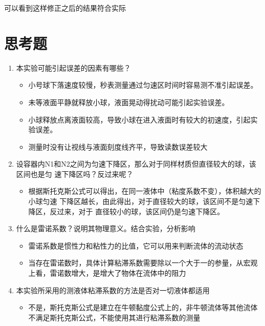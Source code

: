 \documentclass{article}
\begin{document}
可以看到这样修正之后的结果符合实际

\section{思考题}
\begin{enumerate}
    \item 本实验可能引起误差的因素有哪些？
    \begin{itemize}
        \item 小号球下落速度较慢，秒表测量通过匀速区时间时容易测不准引起误差。
        \item 未等液面平静就释放小球，液面晃动得扰动可能引起实验误差。
        \item 小球释放点离液面较高，导致小球在进入液面时有较大的初速度，引起实验误差。
        \item 测量时没有让视线与液面刻度线齐平，导致读数误差较大
    \end{itemize}
    \item 设容器内N1和N2之间为匀速下降区，那么对于同样材质但直径较大的球，该区间也是匀
    速下降区吗？反过来呢？
    \begin{itemize}
        \item 根据斯托克斯公式可以得出，在同一液体中（粘度系数不变），体积越大的小球匀速
        下降区越长，由此得出，对于直径较大的球，该区间不是匀速下降区，反过来，对于
        直径较小的球，该区间仍是匀速下降区。
    \end{itemize}
    \item 什么是雷诺系数？说明其物理意义。结合实验，分析影响
    \begin{itemize}
        \item 雷诺系数是惯性力和粘性力的比值，它可以用来判断流体的流动状态
        \item 当存在雷诺数时，具体计算粘滞系数需要除以一个大于一的参量，从宏观上看，雷诺数增大，是增大了物体在流体中的阻力
    \end{itemize}
    \item 本实验所采用的测液体粘滞系数的方法是否对一切液体都适用
    \begin{itemize}
        \item 不是，斯托克斯公式是建立在牛顿黏度公式上的，非牛顿流体等其他流体不满足斯托克斯公式，不能使用其进行粘滞系数的测量
    \end{itemize}
\end{enumerate}
\end{document}
